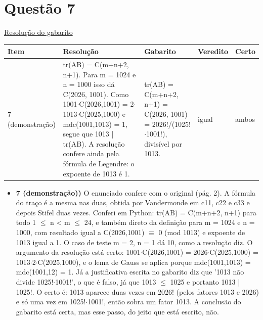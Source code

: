 \documentclass{article}%
\begin{document}
\section*{Questão 7}%
\href{https://poliedroresolve.sistemapoliedro.com.br/vestibulares/ime/2027/ime-2-fase-dia-1-26-10-2026-2-fase-dia-1/dissertativa-7-matematica-2-fase-dia-1-ime-2027}{Resolução do gabarito}\par\smallskip%
\begin{longtable}{@{}p{} p{} p{} p{} p{}@{}}\toprule Item & Resolução & Gabarito & Veredito & Certo \\ \midrule
7 (demonstração) & tr(AB) = C(m+n+2, n+1). Para m = 1024 e n = 1000 isso dá C(2026, 1001). Como 1001$\cdot$C(2026,1001) = 2$\cdot$1013$\cdot$C(2025,1000) e mdc(1001,1013) = 1, segue que 1013 | tr(AB). A resolução confere ainda pela fórmula de Legendre: o expoente de 1013 é 1. & tr(AB) = C(m+n+2, n+1) = C(2026, 1001) = 2026!/(1025!$\cdot$1001!), divisível por 1013. & igual & ambos \\
\bottomrule\end{longtable}%
\begin{itemize}%
\item%
\textbf{7 (demonstração))} O enunciado confere com o original (pág. 2). A fórmula do traço é a mesma nas duas, obtida por Vandermonde em c11, c22 e c33 e depois Stifel duas vezes. Conferi em Python: tr(AB) = C(m+n+2, n+1) para todo 1 $\leq$ n < m $\leq$ 24, e também direto da definição para m = 1024 e n = 1000, com resultado igual a C(2026,1001) $\equiv$ 0 (mod 1013) e expoente de 1013 igual a 1. O caso de teste m = 2, n = 1 dá 10, como a resolução diz. O argumento da resolução está certo: 1001$\cdot$C(2026,1001) = 2026$\cdot$C(2025,1000) = 1013$\cdot$2$\cdot$C(2025,1000), e o lema de Gauss se aplica porque mdc(1001,1013) = mdc(1001,12) = 1. Já a justificativa escrita no gabarito diz que '1013 não divide 1025!$\cdot$1001!', o que é falso, já que 1013 $\leq$ 1025 e portanto 1013 | 1025!. O certo é: 1013 aparece duas vezes em 2026! (pelos fatores 1013 e 2026) e só uma vez em 1025!$\cdot$1001!, então sobra um fator 1013. A conclusão do gabarito está certa, mas esse passo, do jeito que está escrito, não.%
\end{itemize}%
\end{document}
